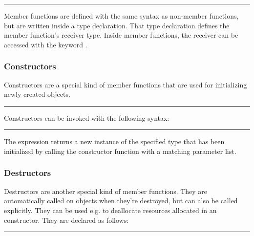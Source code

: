\begin{grammar}
\rule{member-function-call}    \code{(}  \code{)}
\end{grammar}

Member functions are defined with the same syntax as non-member functions, but
are written inside a type declaration. That type declaration defines the member
function's receiver type. Inside member functions, the receiver can be accessed
with the keyword .

\subsubsection{Constructors}

Constructors are a special kind of member functions that are used for
initializing newly created objects.

\begin{grammar}
\rule{constructor-definition}  \code{(}  \code{)} \code{\{}  \code{\}}
\end{grammar}

Constructors can be invoked with the following syntax:

\begin{grammar}
\rule{constructor-call}  \code{(}  \code{)}
\end{grammar}

The  expression returns a new instance of the
specified type that has been initialized by calling the constructor function
with a matching parameter list.

\subsubsection{Destructors}

Destructors are another special kind of member functions. They are
automatically called on objects when they're destroyed, but can also be called
explicitly. They can be used e.g. to deallocate resources allocated in an
constructor. They are declared as follows:

\begin{grammar}
\rule{destructor-definition} \code{\~}  \code{(} \code{)} \code{\{}  \code{\}}
\end{grammar}

